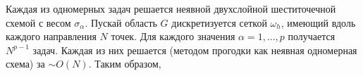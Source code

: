 Каждая из одномерных задач решается неявной двухслойной шеститочечной схемой с весом $\sigma_{\alpha}$.
Пускай область $G$ дискретизуется сеткой $\omega_h$, имеющий вдоль каждого направления $N$ точек.
Для каждого значения $\alpha = 1, \ldots, p$ получается $N^{p - 1}$ задач. 
Каждая из них решается (методом прогодки как неявная одномерная схема) за $\sim O(N)$.
Таким образом, 



        
